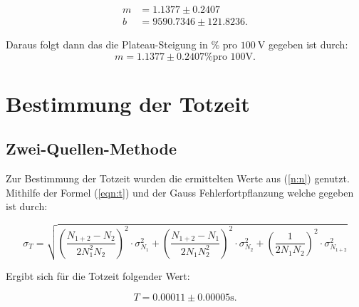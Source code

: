     \begin{align*}
    m &= 1.1377 \pm 0.2407\\
    b &= 9590.7346 \pm 121.8236.
    \end{align*}

    Daraus folgt dann das die Plateau-Steigung in $\si{\percent}$ pro $\SI{100}{\volt}$ gegeben ist durch:
    \begin{equation*}
    m = 1.1377 \pm 0.2407 \si{\percent} \text{pro 100V}.
    \end{equation*}





\section{Bestimmung der Totzeit}
    \subsection{Zwei-Quellen-Methode}
    Zur Bestimmung der Totzeit wurden die ermittelten Werte aus (\ref{n:n}) genutzt. Mithilfe der Formel (\ref{eqn:t}) und der Gauss Fehlerfortpflanzung welche gegeben ist durch:

    \begin{equation}
    \label{eqn:gauß}
    \sigma_T = \sqrt{ \left(\frac{N_{1+2}-N_{2}}{2N_{1}^{2}N_{2}}\right)^2 \cdot \sigma_{N_{1}}^2+ \left(\frac{N_{1+2}-N_{1}}{2N_{1}N_{2}^{2}}\right)^2 \cdot \sigma_{N_{2}}^2+\left(\frac{1}{2N_1N_2}\right)^2 \cdot \sigma_{N_{1+2}}^2} 
    \end{equation}

    Ergibt sich für die Totzeit folgender Wert:

    \begin{equation*}
    T = 0.00011 \pm 0.00005 \si{\second}.
    \end{equation*}



